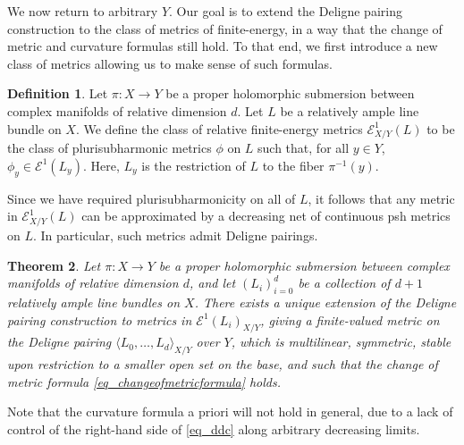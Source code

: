 \documentclass[JEP,XML,SOM,Unicode,NoEqCountersInSection,published]{cedram}
\newtheorem{theorem}{Theorem}[subsection]
\theoremstyle{definition}
\newtheorem{defi}[theorem]{Definition}
\newcommand\cE{\mathcal{E}}
\newcommand\mi{^{-1}}
\begin{document}
We now return to arbitrary $Y$. Our goal is to extend the Deligne pairing construction to the class of metrics of finite-energy, in a way that the change of metric and curvature formulas still hold. To that end, we first introduce a new class of metrics allowing us to make sense of such formulas.
\begin{defi}Let $\pi:X\to Y$ be a proper holomorphic submersion between complex manifolds of relative dimension $d$. Let $L$ be a relatively ample line bundle on $X$. We define the class of relative finite-energy metrics $\cE^1_{X/Y}(L)$ to be the class of plurisubharmonic metrics $\phi$ on $L$ such that, for all $y\in Y$, $\phi_y\in\cE^1(L_y)$. Here, $L_y$ is the restriction of $L$ to the fiber $\pi\mi(y)$.
\end{defi}

Since we have required plurisubharmonicity on all of $L$, it follows that any metric in $\cE^1_{X/Y}(L)$ can be approximated by a decreasing net of continuous psh metrics on $L$. In particular, such metrics admit Deligne pairings.

\begin{theorem}\label{thm_eonepairing}Let $\pi:X\to Y$ be a proper holomorphic submersion between complex manifolds of relative dimension $d$, and let $(L_i)_{i=0}^d$ be a collection of $d+1$ relatively ample line bundles on $X$. There exists a unique extension of the Deligne pairing construction to metrics in $\cE^1(L_i)_{X/Y}$, giving a finite-valued metric on the Deligne pairing $\langle L_0,\dots,L_d\rangle_{X/Y}$ over $Y$, which is multilinear, symmetric, stable upon restriction to a smaller open set on the base, and such that the change of metric formula \eqref{eq_changeofmetricformula} holds.
\end{theorem}
Note that the curvature formula a priori will not hold in general, due to a lack of control of the right-hand side of \eqref{eq_ddc} along arbitrary decreasing limits.
\end{document}
